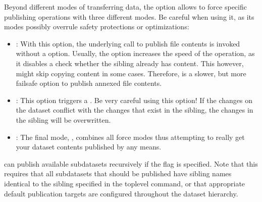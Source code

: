 \sphinxAtStartPar
Beyond different modes of transferring data, the  option allows to force specific publishing operations with three different modes.
Be careful when using it, as its modes possibly overrule safety protections or optimizations:
\begin{itemize}
\item {} 
\sphinxAtStartPar
{}: With this option, the underlying  call to
publish file contents is invoked without a  option. Usually, the
 option increases the speed of the operation, as it disables a check
whether the sibling already has content. This however, might skip copying content
in some cases. Therefore,  is a slower, but more fail\sphinxhyphen{}safe
option to publish annexed file contents.

\item {} 
\sphinxAtStartPar
{}: This option triggers a . Be very careful using
this option! If the changes on the dataset conflict with the changes that exist
in the sibling, the changes in the sibling will be overwritten.

\item {} 
\sphinxAtStartPar
{}: The final mode, , combines all force modes \textendash{} thus attempting to really get your dataset contents published by any means.

\end{itemize}

\sphinxAtStartPar
{} can publish available subdatasets recursively if the
 flag is specified. Note that this requires that all subdatasets
that should be published have sibling names identical to the sibling specified in
the top\sphinxhyphen{}level  command, or that appropriate default publication
targets are configured throughout the dataset hierarchy.

